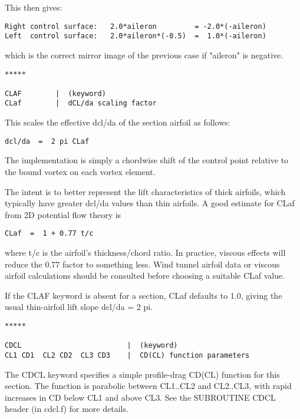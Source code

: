 This then gives:
\begin{lstlisting}
Right control surface:   2.0*aileron         = -2.0*(-aileron)
Left  control surface:   2.0*aileron*(-0.5)  =  1.0*(-aileron)
\end{lstlisting}

which is the correct mirror image of the previous case if "aileron" is negative.


\begin{lstlisting}
*****

CLAF        |  (keyword)
CLaf        |  dCL/da scaling factor

\end{lstlisting}

This scales the effective dcl/da of the section airfoil as follows:

\begin{lstlisting}
dcl/da  =  2 pi CLaf
\end{lstlisting}

The implementation is simply a chordwise shift of the control point
relative to the bound vortex on each vortex element.

The intent is to better represent the lift characteristics 
of thick airfoils, which typically have greater dcl/da values
than thin airfoils.  A good estimate for CLaf from 2D potential
flow theory is

\begin{lstlisting}
CLaf  =  1 + 0.77 t/c
\end{lstlisting}


where t/c is the airfoil's thickness/chord ratio.  In practice,
viscous effects will reduce the 0.77 factor to something less.
Wind tunnel airfoil data or viscous airfoil calculations should
be consulted before choosing a suitable CLaf value.

If the CLAF keyword is absent for a section, CLaf defaults to 1.0, 
giving the usual thin-airfoil lift slope  dcl/da = 2 pi.  

\begin{lstlisting}
*****

CDCL                         |  (keyword)
CL1 CD1  CL2 CD2  CL3 CD3    |  CD(CL) function parameters

\end{lstlisting}

The CDCL keyword specifies a simple profile-drag CD(CL) function 
for this section.  The function is parabolic between CL1..CL2 and 
CL2..CL3, with rapid increases in CD below CL1 and above CL3.
See the SUBROUTINE CDCL header (in cdcl.f) for more details.

